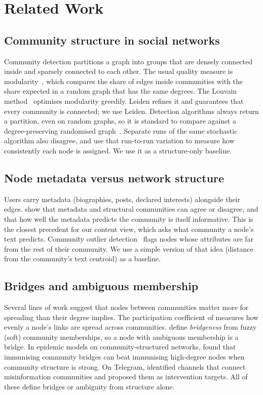 \section{Related Work}
\label{sec:related}

\subsection{Community structure in social networks}
Community detection partitions a graph into groups that are densely connected inside
and sparsely connected to each other. The usual quality measure is
modularity~\citep{newman2006modularity}, which compares the share of edges inside
communities with the share expected in a random graph that has the same degrees. The
Louvain method~\citep{blondel2008louvain} optimises modularity greedily. Leiden
\citep{traag2019leiden} refines it and guarantees that every community is connected;
we use Leiden. Detection algorithms always return a partition, even on random graphs,
so it is standard to compare against a degree-preserving randomised
graph~\citep{maslov2002specificity}. Separate runs of the same stochastic algorithm
also disagree, and \citet{riolo2020consistency} use that run-to-run variation to
measure how consistently each node is assigned. We use it as a structure-only
baseline.

\subsection{Node metadata versus network structure}
Users carry metadata (biographies, posts, declared interests) alongside their edges.
\citet{newman2016annotated} show that metadata and structural communities can agree
or disagree, and that how well the metadata predicts the community is itself
informative. This is the closest precedent for our content view, which asks what
community a node's text predicts. Community outlier detection~\citep{gao2010outliers}
flags nodes whose attributes are far from the rest of their community. We use a simple
version of that idea (distance from the community's text centroid) as a baseline.

\subsection{Bridges and ambiguous membership}
Several lines of work suggest that nodes between communities matter more for spreading
than their degree implies. The participation coefficient of
\citet{guimera2005functional} measures how evenly a node's links are spread across
communities. \citet{nepusz2008fuzzy} define \emph{bridgeness} from fuzzy (soft)
community memberships, so a node with ambiguous membership is a bridge. In epidemic
models on community-structured networks, \citet{salathe2010dynamics} found that
immunising community bridges can beat immunising high-degree nodes when community
structure is strong. On Telegram, \citet{shah2024telegram} identified channels that
connect misinformation communities and proposed them as intervention targets. All of
these define bridges or ambiguity from structure alone.

